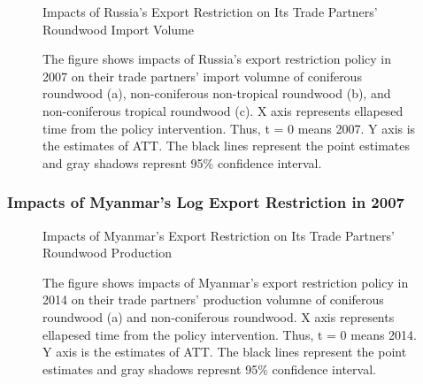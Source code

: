 \documentclass[a4paper,12pt]{article}
\begin{document}
\begin{figure}[H] 
    \centering
    \caption{Impacts of Russia's Export Restriction on Its Trade Partners' Roundwood Import Volume}
    \caption*{\small{The figure shows impacts of Russia's export restriction policy in 2007 on their trade partners' import volumne of coniferous roundwood (a), non-coniferous non-tropical roundwood (b), and non-coniferous tropical roundwood (c). X axis represents ellapesed time from the policy intervention. Thus, t = 0 means 2007. Y axis is the estimates of ATT. The black lines represent the point estimates and gray shadows represnt 95\% confidence interval.}}
    \label{fig:cf_imp_Russia}
\end{figure}

\subsubsection*{Impacts of Myanmar's Log Export Restriction in 2007}

\begin{figure}[H] 
    \centering
    \caption{Impacts of Myanmar's Export Restriction on Its Trade Partners' Roundwood Production}
    \caption*{\small{The figure shows impacts of Myanmar's export restriction policy in 2014 on their trade partners' production volumne of coniferous roundwood (a) and non-coniferous roundwood. X axis represents ellapesed time from the policy intervention. Thus, t = 0 means 2014. Y axis is the estimates of ATT. The black lines represent the point estimates and gray shadows represnt 95\% confidence interval.}}
    \label{fig:att_prod_Myanmar}
\end{figure}
\end{document}
